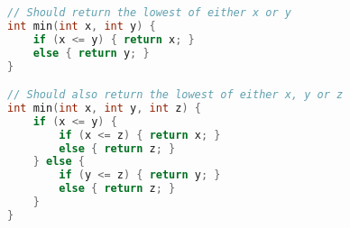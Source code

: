 \begin{lstlisting}[language=C]
// Should return the lowest of either x or y
int min(int x, int y) {
	if (x <= y) { return x; }
	else { return y; }
}

// Should also return the lowest of either x, y or z
int min(int x, int y, int z) {
	if (x <= y) {
		if (x <= z) { return x; }
		else { return z; }
	} else {
		if (y <= z) { return y; }
		else { return z; }
	}
}
\end{lstlisting}

